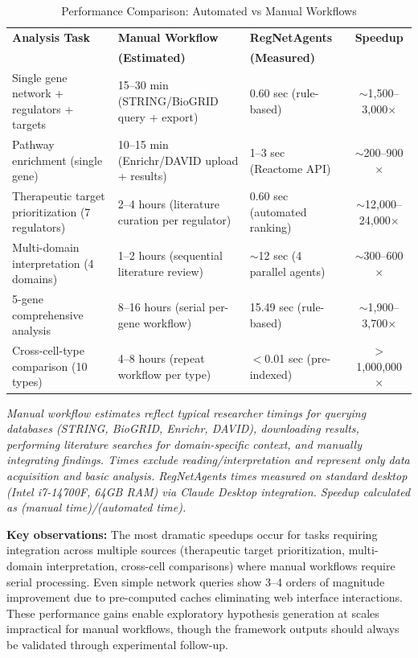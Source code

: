 \documentclass[11pt]{article}
\begin{document}
\begin{table}[htbp]
\centering
\caption{Performance Comparison: Automated vs Manual Workflows}
\begin{tabular}{p{4cm}p{3cm}p{3cm}c}
\toprule
\textbf{Analysis Task} & \textbf{Manual Workflow} & \textbf{RegNetAgents} & \textbf{Speedup} \\
 & \textbf{(Estimated)} & \textbf{(Measured)} & \\
\midrule
Single gene network + regulators + targets & 15--30 min (STRING/BioGRID query + export) & 0.60 sec (rule-based) & $\sim$1,500--3,000$\times$ \\
Pathway enrichment (single gene) & 10--15 min (Enrichr/DAVID upload + results) & 1--3 sec (Reactome API) & $\sim$200--900$\times$ \\
Therapeutic target prioritization (7 regulators) & 2--4 hours (literature curation per regulator) & 0.60 sec (automated ranking) & $\sim$12,000--24,000$\times$ \\
Multi-domain interpretation (4 domains) & 1--2 hours (sequential literature review) & $\sim$12 sec (4 parallel agents) & $\sim$300--600$\times$ \\
5-gene comprehensive analysis & 8--16 hours (serial per-gene workflow) & 15.49 sec (rule-based) & $\sim$1,900--3,700$\times$ \\
Cross-cell-type comparison (10 types) & 4--8 hours (repeat workflow per type) & $<$0.01 sec (pre-indexed) & $>$1,000,000$\times$ \\
\bottomrule
\end{tabular}
\label{tab:speedup}
\end{table}

\textit{Manual workflow estimates reflect typical researcher timings for querying databases (STRING, BioGRID, Enrichr, DAVID), downloading results, performing literature searches for domain-specific context, and manually integrating findings. Times exclude reading/interpretation and represent only data acquisition and basic analysis. RegNetAgents times measured on standard desktop (Intel i7-14700F, 64GB RAM) via Claude Desktop integration. Speedup calculated as (manual time)/(automated time).}

\textbf{Key observations:} The most dramatic speedups occur for tasks requiring integration across multiple sources (therapeutic target prioritization, multi-domain interpretation, cross-cell comparisons) where manual workflows require serial processing. Even simple network queries show 3--4 orders of magnitude improvement due to pre-computed caches eliminating web interface interactions. These performance gains enable exploratory hypothesis generation at scales impractical for manual workflows, though the framework outputs should always be validated through experimental follow-up.
\end{document}

